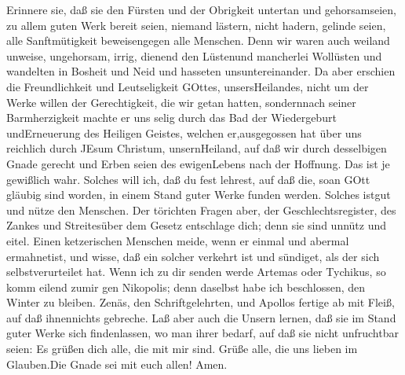  Erinnere sie, daß sie den Fürsten und der Obrigkeit
untertan und gehorsamseien, zu allem guten Werk bereit seien,
 niemand lästern, nicht hadern, gelinde seien, alle
Sanftmütigkeit beweisengegen alle Menschen.  Denn wir waren
auch weiland unweise, ungehorsam, irrig, dienend den Lüstenund
mancherlei Wollüsten und wandelten in Bosheit und Neid und hasseten
unsuntereinander.  Da aber erschien die Freundlichkeit und
Leutseligkeit GOttes, unsersHeilandes,  nicht um der Werke
willen der Gerechtigkeit, die wir getan hatten, sondernnach seiner
Barmherzigkeit machte er uns selig durch das Bad der Wiedergeburt
undErneuerung des Heiligen Geistes,  welchen er,ausgegossen
hat über uns reichlich durch JEsum Christum, unsernHeiland, 
auf daß wir durch desselbigen Gnade gerecht und Erben seien des
ewigenLebens nach der Hoffnung.  Das ist je gewißlich wahr.
Solches will ich, daß du fest lehrest, auf daß die, soan GOtt gläubig
sind worden, in einem Stand guter Werke funden werden. Solches istgut
und nütze den Menschen.  Der törichten Fragen aber, der
Geschlechtsregister, des Zankes und Streitesüber dem Gesetz entschlage
dich; denn sie sind unnütz und eitel.  Einen ketzerischen
Menschen meide, wenn er einmal und abermal ermahnetist, 
und wisse, daß ein solcher verkehrt ist und sündiget, als der sich
selbstverurteilet hat.  Wenn ich zu dir senden werde
Artemas oder Tychikus, so komm eilend zumir gen Nikopolis; denn daselbst
habe ich beschlossen, den Winter zu bleiben.  Zenäs, den
Schriftgelehrten, und Apollos fertige ab mit Fleiß, auf daß ihnennichts
gebreche.  Laß aber auch die Unsern lernen, daß sie im
Stand guter Werke sich findenlassen, wo man ihrer bedarf, auf daß sie
nicht unfruchtbar seien:  Es grüßen dich alle, die mit mir
sind. Grüße alle, die uns lieben im Glauben.Die Gnade sei mit euch
allen! Amen.
